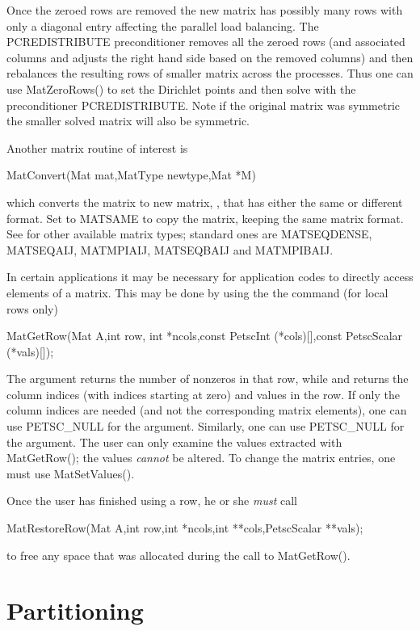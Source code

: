 Once the zeroed rows are removed the new matrix has possibly many rows
with only a diagonal entry affecting the parallel load balancing. The
PCREDISTRIBUTE preconditioner removes all the zeroed rows (and
associated columns and adjusts the right hand side based on the
removed columns) and then rebalances the resulting rows of smaller
matrix across the processes. Thus one can use MatZeroRows() to set the Dirichlet points and then solve with the preconditioner PCREDISTRIBUTE. Note if the original matrix was symmetric the
smaller solved matrix will also be symmetric.


Another matrix routine of interest is
\begin{tabbing}
  MatConvert(Mat mat,MatType newtype,Mat *M)
\end{tabbing}
which converts the matrix  to new matrix, , that has
either the same or different format.  Set  to MATSAME
to copy the matrix, keeping the same matrix format.  See
 for other available matrix types;
standard ones are MATSEQDENSE, MATSEQAIJ, MATMPIAIJ,
               MATSEQBAIJ and MATMPIBAIJ.

In certain applications it may be necessary for application codes
to directly access elements of a matrix. This may be done by using the
the command (for local rows only)
\begin{tabbing}
  MatGetRow(Mat A,int row, int *ncols,const PetscInt (*cols)[],const PetscScalar (*vals)[]);
\end{tabbing}
The argument  returns the number of nonzeros in that row,
while  and  returns the column indices (with indices
starting at zero) and values in the row. If only the column
indices are needed (and not the corresponding matrix elements), one
can use PETSC\_NULL for the  argument. Similarly,
one can use PETSC\_NULL for the  argument.
The user can only examine the values extracted with MatGetRow();
the values {\em cannot} be altered.
To change the matrix entries, one must use MatSetValues().

Once the user has finished using a row, he or she {\em must} call
\begin{tabbing}
  MatRestoreRow(Mat A,int row,int *ncols,int **cols,PetscScalar **vals);
\end{tabbing}
to free any space that was allocated during the call to MatGetRow().

\section{Partitioning}
\label{sec_partitioning}  

